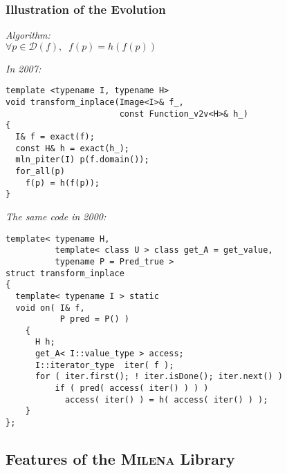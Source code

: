 \documentclass{beamer}
\newcommand{\mln}{\textsc{Milena}\xspace}
\begin{document}
\begin{frame}[fragile]
  \frametitle{Illustration of the Evolution}


\begin{minipage}{0.5\linewidth}
{\it Algorithm:}\\
\smallskip
{\tiny
$\forall p \in \mathcal{D}(f), \;\; f(p) = \mathit{h}(f(p))$
}

\bigskip\medskip

{\it In 2007:}
\smallskip
\begin{lstlisting}[basicstyle={\tiny\sffamily}]
template <typename I, typename H>
void transform_inplace(Image<I>& f_,
                       const Function_v2v<H>& h_)
{
  I& f = exact(f);
  const H& h = exact(h_);
  mln_piter(I) p(f.domain());
  for_all(p)
    f(p) = h(f(p));
}

\end{lstlisting}

\end{minipage}
  \hspace*{2mm}
\begin{minipage}{.45\linewidth}

{\it The same code in 2000:}
\smallskip
\begin{lstlisting}[basicstyle={\tiny\sffamily}]
template< typename H,
          template< class U > class get_A = get_value,
          typename P = Pred_true >
struct transform_inplace
{
  template< typename I > static
  void on( I& f,
           P pred = P() )
    {
      H h;
      get_A< I::value_type > access;
      I::iterator_type  iter( f );
      for ( iter.first(); ! iter.isDone(); iter.next() )
          if ( pred( access( iter() ) ) )
            access( iter() ) = h( access( iter() ) );
    }
};
\end{lstlisting}
  
\end{minipage}

\end{frame}



\subsection{Features of the \mln Library}
\end{document}
